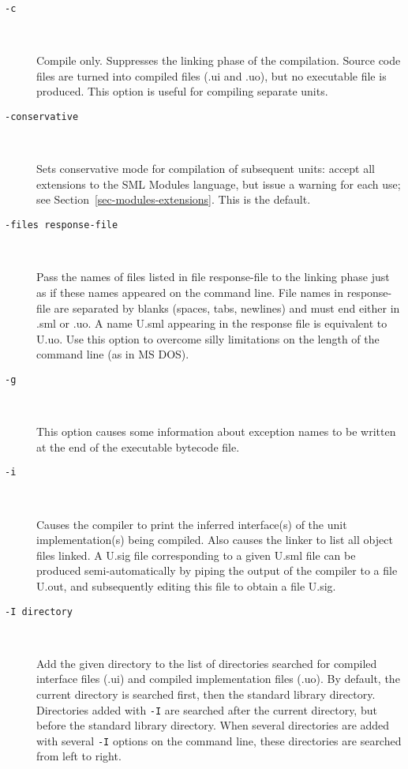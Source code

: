 \documentclass[fleqn,a4paper]{article}
\begin{document}
\begin{description}
\item[{\tt -c}]\mbox{ }

  Compile only. Suppresses the linking phase of the compilation.
  Source code files are turned into compiled files (.ui and .uo), but
  no executable file is produced.  This option is useful for compiling
  separate units.

\item[{\tt -conservative}]\mbox{ }
  
  Sets conservative mode for compilation of subsequent units: accept
  all extensions to the SML Modules language, but issue a warning for
  each use; see Section~\ref{sec-modules-extensions}.  This is the
  default.

\item[{\tt -files {\rm response-file}}]\mbox{ }

  Pass the names of files listed in file response-file to the linking
  phase just as if these names appeared on the command line.  File
  names in response-file are separated by blanks (spaces, tabs,
  newlines) and must end either in .sml or .uo.  A name U.sml
  appearing in the response file is equivalent to U.uo.  Use this
  option to overcome silly limitations on the length of the
  command line (as in MS DOS).

\item[{\tt -g}]\mbox{ }

  This option causes some information about exception names to be
  written at the end of the executable bytecode file.  

\item[{\tt -i}]\mbox{ }
  
  Causes the compiler to print the inferred interface(s) of the unit
  implementation(s) being compiled.  Also causes the linker to list
  all object files linked.  A U.sig file corresponding to a given
  U.sml file can be produced semi-automatically by piping the output
  of the compiler to a file U.out, and subsequently editing this file
  to obtain a file U.sig.

\item[{\tt -I {\rm directory}}]\mbox{ }
  
  Add the given directory to the list of directories searched for
  compiled interface files (.ui) and compiled implementation files
  (.uo).  By default, the current directory is searched first, then
  the standard library directory.  Directories added with {\tt -I} are
  searched after the current directory, but before the standard
  library directory.  When several directories are added with several
  {\tt -I} options on the command line, these directories are searched
  from left to right.


\end{description}
\end{document}

